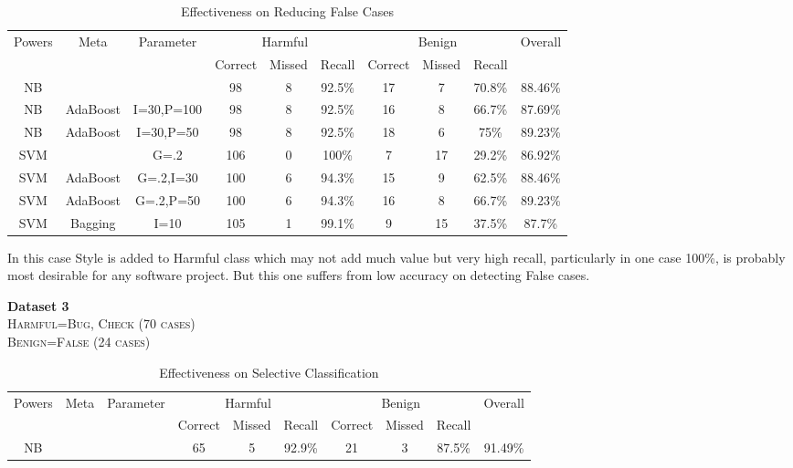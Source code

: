 \documentclass[11pt]{article}
\begin{document}
\begin{table}[h!]
\centering
\begin{tabular*}{1.045\textwidth}{|c|c|c|c|c|c|c|c|c|c|}
\hline
\multicolumn{1}{|c|}{\multirow{2}{*}{Powers}} & 
\multicolumn{1}{|c|}{\multirow{2}{*}{Meta}} & 
\multicolumn{1}{|c|}{\multirow{2}{*}{Parameter}} & 
\multicolumn{3}{|c|}{Harmful} & 
\multicolumn{3}{|c|}{Benign} & 
\multicolumn{1}{|c|}{\multirow{2}{*}{Overall}} \\
\cline{4-9}

& & & Correct & Missed & Recall & Correct & Missed & Recall & \\
\hline
NB &  &  & 98 & 8 & 92.5\% & 17 & 7 & 70.8\% & 88.46\% \\ 
\hline 
NB & AdaBoost & I=30,P=100 & 98 & 8 & 92.5\% & 16 & 8 & 66.7\% & 87.69\%\\ 
\hline 
NB & AdaBoost & I=30,P=50 & 98 & 8 & 92.5\% & 18 & 6 & 75\% & 89.23\% \\ 
\hline 
SVM &  & G=.2 & 106 & 0 & 100\% & 7 & 17 & 29.2\% & 86.92\%\\ 
\hline 
SVM & AdaBoost & G=.2,I=30 & 100 & 6 & 94.3\% & 15 & 9 & 62.5\% & 88.46\%\\ 
\hline 
SVM & AdaBoost & G=.2,P=50 & 100 & 6 & 94.3\% & 16 & 8 & 66.7\% & 89.23\%\\ 
\hline 
SVM & Bagging & I=10 & 105 & 1 & 99.1\% & 9 & 15 & 37.5\% & 87.7\%\\
\hline
\end{tabular*}
\caption{Effectiveness on Reducing False Cases}
\label{tab:dataset2}
\end{table}


\noindent
In this case Style is added to Harmful class which may not add much value but very high recall, particularly in one case 100\%, is probably most desirable for any software project. But this one suffers from low accuracy on detecting False cases.

\vspace{10 pt}
\noindent
\textbf{Dataset 3}\\
\textsc{Harmful=Bug, Check (70 cases)}\\
\textsc{Benign=False (24 cases)}\\

\begin{table}[h!]
\centering
\begin{tabular*}{.977\textwidth}{|c|c|c|c|c|c|c|c|c|c|}
\hline
\multicolumn{1}{|c|}{\multirow{2}{*}{Powers}} & 
\multicolumn{1}{|c|}{\multirow{2}{*}{Meta}} & 
\multicolumn{1}{|c|}{\multirow{2}{*}{Parameter}} & 
\multicolumn{3}{|c|}{Harmful} & 
\multicolumn{3}{|c|}{Benign} & 
\multicolumn{1}{|c|}{\multirow{2}{*}{Overall}} \\
\cline{4-9}

& & & Correct & Missed & Recall & Correct & Missed & Recall & \\
\hline
NB & & & 65 & 5 & 92.9\% & 21 & 3 & 87.5\% & 91.49\% \\
\hline
\end{tabular*}
\caption{Effectiveness on Selective Classification}
\label{tab:dataset3}
\end{table}
\end{document}
